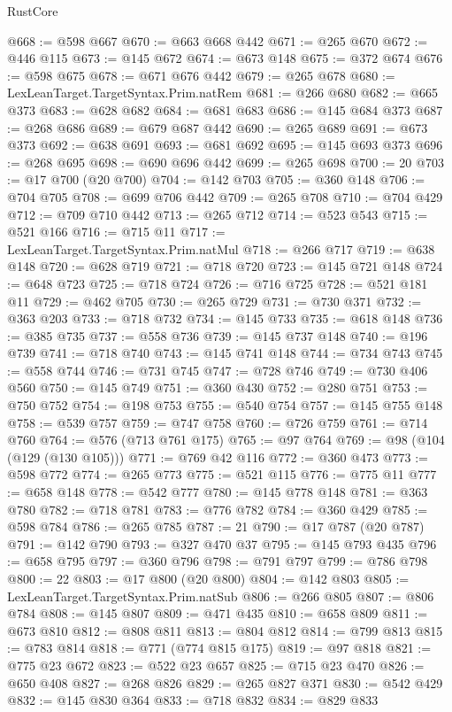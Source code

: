\begin{lexlean}{RustCore}
\begin{coremodule}
@668 := @598 @667
@670 := @663 @668 @442
@671 := @265 @670
@672 := @446 @115
@673 := @145 @672
@674 := @673 @148
@675 := @372 @674
@676 := @598 @675
@678 := @671 @676 @442
@679 := @265 @678
@680 := LexLeanTarget.TargetSyntax.Prim.natRem
@681 := @266 @680
@682 := @665 @373
@683 := @628 @682
@684 := @681 @683
@686 := @145 @684 @373
@687 := @268 @686
@689 := @679 @687 @442
@690 := @265 @689
@691 := @673 @373
@692 := @638 @691
@693 := @681 @692
@695 := @145 @693 @373
@696 := @268 @695
@698 := @690 @696 @442
@699 := @265 @698
@700 := 20
@703 := @17 @700 (@20 @700)
@704 := @142 @703
@705 := @360 @148
@706 := @704 @705
@708 := @699 @706 @442
@709 := @265 @708
@710 := @704 @429
@712 := @709 @710 @442
@713 := @265 @712
@714 := @523 @543
@715 := @521 @166
@716 := @715 @11
@717 := LexLeanTarget.TargetSyntax.Prim.natMul
@718 := @266 @717
@719 := @638 @148
@720 := @628 @719
@721 := @718 @720
@723 := @145 @721 @148
@724 := @648 @723
@725 := @718 @724
@726 := @716 @725
@728 := @521 @181 @11
@729 := @462 @705
@730 := @265 @729
@731 := @730 @371
@732 := @363 @203
@733 := @718 @732
@734 := @145 @733
@735 := @618 @148
@736 := @385 @735
@737 := @558 @736
@739 := @145 @737 @148
@740 := @196 @739
@741 := @718 @740
@743 := @145 @741 @148
@744 := @734 @743
@745 := @558 @744
@746 := @731 @745
@747 := @728 @746
@749 := @730 @406 @560
@750 := @145 @749
@751 := @360 @430
@752 := @280 @751
@753 := @750 @752
@754 := @198 @753
@755 := @540 @754
@757 := @145 @755 @148
@758 := @539 @757
@759 := @747 @758
@760 := @726 @759
@761 := @714 @760
@764 := @576 (@713 @761 @175)
@765 := @97 @764
@769 := @98 (@104 (@129 (@130 @105)))
@771 := @769 @42 @116
@772 := @360 @473
@773 := @598 @772
@774 := @265 @773
@775 := @521 @115
@776 := @775 @11
@777 := @658 @148
@778 := @542 @777
@780 := @145 @778 @148
@781 := @363 @780
@782 := @718 @781
@783 := @776 @782
@784 := @360 @429
@785 := @598 @784
@786 := @265 @785
@787 := 21
@790 := @17 @787 (@20 @787)
@791 := @142 @790
@793 := @327 @470 @37
@795 := @145 @793 @435
@796 := @658 @795
@797 := @360 @796
@798 := @791 @797
@799 := @786 @798
@800 := 22
@803 := @17 @800 (@20 @800)
@804 := @142 @803
@805 := LexLeanTarget.TargetSyntax.Prim.natSub
@806 := @266 @805
@807 := @806 @784
@808 := @145 @807
@809 := @471 @435
@810 := @658 @809
@811 := @673 @810
@812 := @808 @811
@813 := @804 @812
@814 := @799 @813
@815 := @783 @814
@818 := @771 (@774 @815 @175)
@819 := @97 @818
@821 := @775 @23 @672
@823 := @522 @23 @657
@825 := @715 @23 @470
@826 := @650 @408
@827 := @268 @826
@829 := @265 @827 @371
@830 := @542 @429
@832 := @145 @830 @364
@833 := @718 @832
@834 := @829 @833

\end{coremodule}
\end{lexlean}
